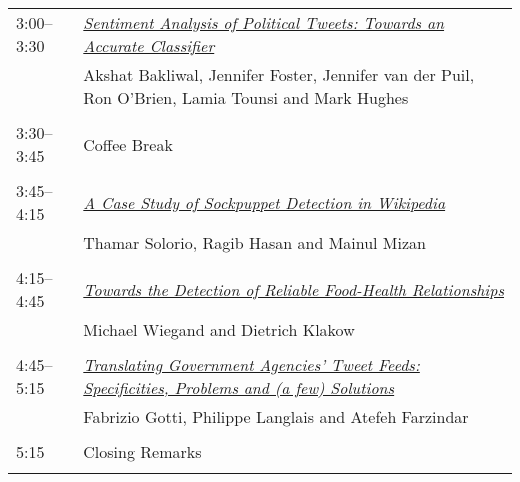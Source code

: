 \begin{tabular}{p{20mm}p{128mm}}
3:00--3:30 & \hyperlink{page.49}{\em Sentiment Analysis of Political Tweets: Towards an Accurate Classifier}\\
         & Akshat Bakliwal, Jennifer Foster, Jennifer van der Puil, Ron O'Brien, Lamia Tounsi and Mark Hughes \\
\\

3:30--3:45 & Coffee Break \\
\\
3:45--4:15 & \hyperlink{page.59}{\em A Case Study of Sockpuppet Detection in Wikipedia}\\
         & Thamar Solorio, Ragib Hasan and Mainul Mizan \\
\\

4:15--4:45 & \hyperlink{page.69}{\em Towards the Detection of Reliable Food-Health Relationships}\\
         & Michael Wiegand and Dietrich Klakow \\
\\

4:45--5:15 & \hyperlink{page.80}{\em Translating Government Agencies’ Tweet Feeds: Specificities, Problems and (a few) Solutions}\\
         & Fabrizio Gotti, Philippe Langlais and Atefeh Farzindar \\
\\

5:15 & Closing Remarks \\
\\


\end{tabular}
